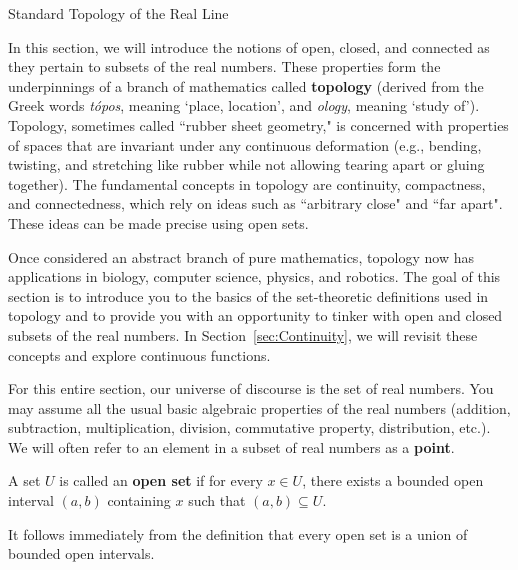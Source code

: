 \begin{section}{Standard Topology of the Real Line}\label{sec:Topology}

In this section, we will introduce the notions of open, closed, and connected as they pertain to subsets of the real numbers.  These properties form the underpinnings of a branch of mathematics called \textbf{topology} (derived from the Greek words \emph{t\'opos}, meaning `place, location', and \emph{ology}, meaning `study of'). Topology, sometimes called ``rubber sheet geometry," is concerned with properties of spaces that are invariant under any continuous deformation (e.g., bending, twisting, and stretching like rubber while not allowing tearing apart or gluing together). The fundamental concepts in topology are continuity, compactness, and connectedness, which rely on ideas such as ``arbitrary close" and ``far apart". These ideas can be made precise using open sets.  

Once considered an abstract branch of pure mathematics, topology now has applications in biology, computer science, physics, and robotics. The goal of this section is to introduce you to the basics of the set-theoretic definitions used in topology and to provide you with an opportunity to tinker with open and closed subsets of the real numbers. In Section~\ref{sec:Continuity}, we will revisit these concepts and explore continuous functions.

For this entire section, our universe of discourse is the set of real numbers.  You may assume all the usual basic algebraic properties of the real numbers (addition, subtraction, multiplication, division, commutative property, distribution, etc.). We will often refer to an element in a subset of real numbers as a \textbf{point}.

\begin{definition}\label{def:open}
A set $U$ is called an \textbf{open set} if for every $x \in U$, there exists a bounded open interval $(a,b)$ containing $x$ such that $(a,b)\subseteq U$.
\end{definition}

It follows immediately from the definition that every open set is a union of bounded open intervals.


\end{section}
